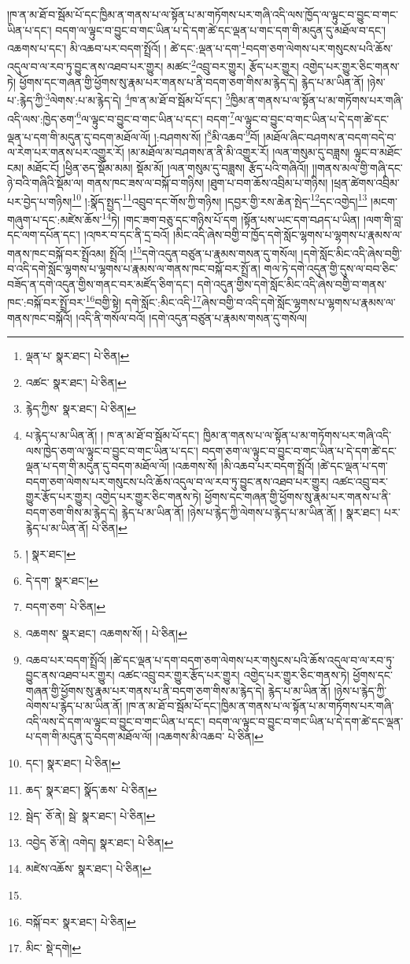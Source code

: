 །ཁ་ན་མ་ཐོ་བ་སྦོམ་པོ་དང་ཁྱིམ་ན་གནས་པ་ལ་སྟོན་པ་མ་གཏོགས་པར་གཞི་འདི་ལས་ཁྱོད་ལ་ལྟུང་བ་བྱུང་བ་གང་ཡིན་པ་དང་། བདག་ལ་ལྟུང་བ་བྱུང་བ་གང་ཡིན་པ་དེ་དག་ཚེ་དང་ལྡན་པ་གང་དག་གི་མདུན་དུ་མཐོལ་བ་དང་། འཆགས་པ་དང་། མི་འཆབ་པར་བདག་སྤྲོའོ། །
ཚེ་དང་:ལྡན་པ་དག་\footnote{ལྡན་པ་  སྣར་ཐང་།  པེ་ཅིན། }བདག་ཅག་ལེགས་པར་གསུངས་པའི་ཆོས་འདུལ་བ་ལ་རབ་ཏུ་བྱུང་ནས་འཐབ་པར་གྱུར། མཚང་\footnote{འཚང་  སྣར་ཐང་།  པེ་ཅིན། }འབྲུ་བར་གྱུར། རྩོད་པར་གྱུར། འགྱེད་པར་གྱུར་ཅིང་གནས་ཏེ། ཕྱོགས་དང་གཞན་གྱི་ཕྱོགས་སུ་རྣམ་པར་གནས་པ་ནི་བདག་ཅག་གིས་མ་རྙེད་དེ། རྙེད་པ་མ་ཡིན་ནོ། །ཉེས་པ་:རྙེད་ཀྱི་\footnote{རྙེད་ཀྱིས་  སྣར་ཐང་།  པེ་ཅིན། }ལེགས་:པ་མ་རྙེད་དེ། \footnote{པ་རྙེད་པ་མ་ཡིན་ནོ། ། ཁ་ན་མ་ཐོ་བ་སྦོམ་པོ་དང་། ཁྱིམ་ན་གནས་པ་ལ་སྟོན་པ་མ་གཏོགས་པར་གཞི་འདི་ལས་ཁྱེད་ཅག་ལ་ལྟུང་བ་བྱུང་བ་གང་ཡིན་པ་དང་། བདག་ཅག་ལ་ལྟུང་བ་བྱུང་བ་གང་ཡིན་པ་དེ་དག་ཚེ་དང་ལྡན་པ་དག་གི་མདུན་དུ་བདག་མཐོལ་ལོ། །འཆགས་སོ། །མི་འཆབ་པར་བདག་སྤྲོའོ། །ཚེ་དང་ལྡན་པ་དག་བདག་ཅག་ལེགས་པར་གསུངས་པའི་ཆོས་འདུལ་བ་ལ་རབ་ཏུ་བྱུང་ནས་འཐབ་པར་གྱུར། འཚང་འབྲུ་བར་གྱུར་རྩོད་པར་གྱུར། འགྱེད་པར་གྱུར་ཅིང་གནས་ཏེ། ཕྱོགས་དང་གཞན་གྱི་ཕྱོགས་སུ་རྣམ་པར་གནས་པ་ནི་བདག་ཅག་གིས་མ་རྙེད་དེ། རྙེད་པ་མ་ཡིན་ནོ། །ཉེས་པ་རྙེད་ཀྱི་ལེགས་པ་རྙེད་པ་མ་ཡིན་ནོ། །  སྣར་ཐང་། པར་རྙེད་པ་མ་ཡིན་ནོ།   པེ་ཅིན། }ཁ་ན་མ་ཐོ་བ་སྦོམ་པོ་དང་། \footnote{།  སྣར་ཐང་། }ཁྱིམ་ན་གནས་པ་ལ་སྟོན་པ་མ་གཏོགས་པར་གཞི་འདི་ལས་:ཁྱེད་ཅག་\footnote{དེ་དག་  སྣར་ཐང་། }ལ་ལྟུང་བ་བྱུང་བ་གང་ཡིན་པ་དང་། བདག་\footnote{བདག་ཅག་  པེ་ཅིན། }ལ་ལྟུང་བ་བྱུང་བ་གང་ཡིན་པ་དེ་དག་ཚེ་དང་ལྡན་པ་དག་གི་མདུན་དུ་བདག་མཐོལ་ལོ། །:བཤགས་སོ། །\footnote{འཆགས་  སྣར་ཐང་། འཆགས་སོ། །  པེ་ཅིན། }མི་འཆབ་\footnote{འཆབ་པར་བདག་སྤྲོའོ། །ཚེ་དང་ལྡན་པ་དག་བདག་ཅག་ལེགས་པར་གསུངས་པའི་ཆོས་འདུལ་བ་ལ་རབ་ཏུ་བྱུང་ནས་འཐབ་པར་གྱུར། འཚང་འབྲུ་བར་གྱུར་རྩོད་པར་གྱུར། འགྱེད་པར་གྱུར་ཅིང་གནས་ཏེ། ཕྱོགས་དང་གཞན་གྱི་ཕྱོགས་སུ་རྣམ་པར་གནས་པ་ནི་བདག་ཅག་གིས་མ་རྙེད་དེ། རྙེད་པ་མ་ཡིན་ནོ། །ཉེས་པ་རྙེད་ཀྱི་ལེགས་པ་རྙེད་པ་མ་ཡིན་ནོ། །ཁ་ན་མ་ཐོ་བ་སྦོམ་པོ་དང་།ཁྱིམ་ན་གནས་པ་ལ་སྟོན་པ་མ་གཏོགས་པར་གཞི་འདི་ལས་དེ་དག་ལ་ལྟུང་བ་བྱུང་བ་གང་ཡིན་པ་དང་། བདག་ལ་ལྟུང་བ་བྱུང་བ་གང་ཡིན་པ་དེ་དག་ཚེ་དང་ལྡན་པ་དག་གི་མདུན་དུ་བདག་མཐོལ་ལོ། །འཆགས་མི་འཆབ་  པེ་ཅིན། }བོ། །མཐོལ་ཞིང་བཤགས་ན་བདག་བདེ་བ་ལ་རེག་པར་གནས་པར་འགྱུར་རོ། །མ་མཐོལ་མ་བཤགས་ན་ནི་མི་འགྱུར་རོ། །ལན་གསུམ་དུ་བཟླས། ལྟུང་བ་མཐོང་ངམ། མཐོང་ངོ། །ཕྱིན་ཅད་སྡོམ་མམ། སྡོམ་མོ། །ལན་གསུམ་དུ་བཟླས། རྩོད་པའི་གཞིའོ།། །།གནས་མལ་གྱི་གཞི་དང་ཉེ་བའི་གཞིའི་སྡོམ་ལ། གནས་ཁང་ཟས་ལ་བསྐོ་བ་གཉིས། །ཐུག་པ་བག་ཆོས་འབྲིམ་པ་གཉིས། །ཕྲན་ཚེགས་འབྲིམ་པར་བྱེད་པ་གཉིས།\footnote{དང་།  སྣར་ཐང་།  པེ་ཅིན། } །:སྣོད་སྤྱད་\footnote{ཆད་  སྣར་ཐང་། སྣོད་ཆས་  པེ་ཅིན། }འབྲུབ་དང་གོས་ཀྱི་གཉིས། །དབྱར་གྱི་རས་ཆེན་སྤེད་\footnote{སྦེད་  ཅོ་ནེ། སྦེ་  སྣར་ཐང་།  པེ་ཅིན། }དང་འགྱེད།\footnote{འབྱེད  ཅོ་ནེ། འགེད།  སྣར་ཐང་།  པེ་ཅིན། } །མངག་གཞུག་པ་དང་:མཛེས་ཆོས་\footnote{མཛེས་འཆོས་  སྣར་ཐང་།  པེ་ཅིན། }ཏེ། །གང་ཟག་བཅུ་དང་གཉིས་པོ་དག །སྟོན་པས་ཡང་དག་བཤད་པ་ཡིན། །ལག་གི་བླ་དང་ལག་དཔོན་དང་། །འཁར་བ་དང་ནི་དྲ་བའོ། །མིང་འདི་ཞེས་བགྱི་བ་ཁྱོད་དགེ་སློང་ལྷགས་པ་ལྷགས་པ་རྣམས་ལ་གནས་ཁང་བསྐོ་བར་སྤྲོའམ། སྤྲོའོ། །\footnote{}དགེ་འདུན་བཙུན་པ་རྣམས་གསན་དུ་གསོལ། །དགེ་སློང་མིང་འདི་ཞེས་བགྱི་བ་འདི་དགེ་སློང་ལྷགས་པ་ལྷགས་པ་རྣམས་ལ་གནས་ཁང་བསྐོ་བར་སྤྲོ་ན། གལ་ཏེ་དགེ་འདུན་གྱི་དུས་ལ་བབ་ཅིང་བཟོད་ན་དགེ་འདུན་གྱིས་གནང་བར་མཛོད་ཅིག་དང་། དགེ་འདུན་གྱིས་དགེ་སློང་མིང་འདི་ཞེས་བགྱི་བ་གནས་ཁང་:བསྐོ་བར་སྤྲོ་བར་\footnote{བསྐོ་བར་  སྣར་ཐང་།  པེ་ཅིན། }བགྱི་སྟེ། དགེ་སློང་:མིང་འདི་\footnote{མིང་  སྡེ་དགེ། }ཞེས་བགྱི་བ་འདི་དགེ་སློང་ལྷགས་པ་ལྷགས་པ་རྣམས་ལ་གནས་ཁང་བསྐོའོ། །འདི་ནི་གསོལ་བའོ། །དགེ་འདུན་བཙུན་པ་རྣམས་གསན་དུ་གསོལ། 